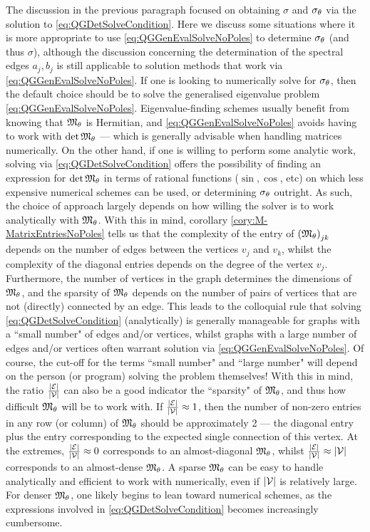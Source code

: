 The discussion in the previous paragraph focused on obtaining $\sigma$ and $\sigma_\theta$ via the solution to \eqref{eq:QGDetSolveCondition}.
Here we discuss some situations where it is more appropriate to use \eqref{eq:QGGenEvalSolveNoPoles} to determine $\sigma_{\theta}$ (and thus $\sigma$), although the discussion concerning the determination of the spectral edges $a_j, b_j$ is still applicable to solution methods that work via \eqref{eq:QGGenEvalSolveNoPoles}.
If one is looking to numerically solve for $\sigma_\theta$, then the default choice should be to solve the generalised eigenvalue problem \eqref{eq:QGGenEvalSolveNoPoles}.
Eigenvalue-finding schemes usually benefit from knowing that $\mathfrak{M}_\theta$ is Hermitian, and \eqref{eq:QGGenEvalSolveNoPoles} avoids having to work with $\det\mathfrak{M}_\theta$ --- which is generally advisable when handling matrices numerically. 
On the other hand, if one is willing to perform some analytic work, solving via \eqref{eq:QGDetSolveCondition} offers the possibility of finding an expression for $\det\mathfrak{M}_\theta$ in terms of rational functions ($\sin, \cos$, etc) on which less expensive numerical schemes can be used, or determining $\sigma_\theta$ outright.
As such, the choice of approach largely depends on how willing the solver is to work analytically with $\mathfrak{M}_\theta$.
With this in mind, corollary \ref{cory:M-MatrixEntriesNoPoles} tells us that the complexity of the entry of $\left( \mathfrak{M}_\theta \right)_{jk}$ depends on the number of edges between the vertices $v_j$ and $v_k$, whilst the complexity of the diagonal entries depends on the degree of the vertex $v_j$.
Furthermore, the number of vertices in the graph determines the dimensions of $\mathfrak{M}_\theta$, and the sparsity of $\mathfrak{M}_\theta$ depends on the number of pairs of vertices that are not (directly) connected by an edge.
This leads to the colloquial rule that solving \eqref{eq:QGDetSolveCondition} (analytically) is generally manageable for graphs with a ``small number" of edges and/or vertices, whilst graphs with a large number of edges and/or vertices often warrant solution via \eqref{eq:QGGenEvalSolveNoPoles}.
Of course, the cut-off for the terms ``small number" and ``large number" will depend on the person (or program) solving the problem themselves!
With this in mind, the ratio $\frac{\left\lvert \mathcal{E} \right\rvert}{\left\lvert \mathcal{V} \right\rvert}$ can also be a good indicator the ``sparsity" of $\mathfrak{M}_\theta$, and thus how difficult $\mathfrak{M}_\theta$ will be to work with.
If $\frac{\left\lvert \mathcal{E} \right\rvert}{\left\lvert \mathcal{V} \right\rvert}\approx 1$, then the number of non-zero entries in any row (or column) of $\mathfrak{M}_\theta$ should be approximately 2 --- the diagonal entry plus the entry corresponding to the expected single connection of this vertex.
At the extremes, $\frac{\left\lvert \mathcal{E} \right\rvert}{\left\lvert \mathcal{V} \right\rvert}\approx 0$ corresponds to an almost-diagonal $\mathfrak{M}_\theta$, whilst $\frac{\left\lvert \mathcal{E} \right\rvert}{\left\lvert \mathcal{V} \right\rvert}\approx \left\lvert \mathcal{V} \right\rvert$ corresponds to an almost-dense $\mathfrak{M}_\theta$.
A sparse $\mathfrak{M}_\theta$ can be easy to handle analytically and efficient to work with numerically, even if $\left\lvert \mathcal{V} \right\rvert$ is relatively large.
For denser $\mathfrak{M}_\theta$, one likely begins to lean toward numerical schemes, as the expressions involved in \eqref{eq:QGDetSolveCondition} becomes increasingly cumbersome.